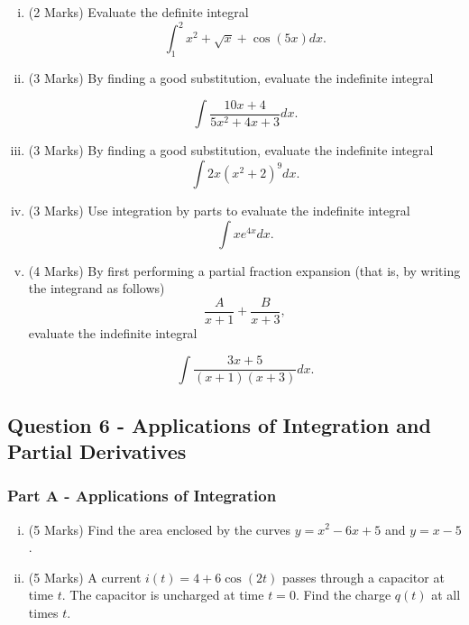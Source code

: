 \documentclass[a4paper,12pt]{article}
\begin{document}

\begin{enumerate}[(i)]
	\item (2 Marks)  Evaluate the definite integral
	\[ \int^2_1 x^2 + \sqrt{x} + \cos(5x) dx. \]
	\item (3 Marks) By finding a good substitution, evaluate the indefinite integral

  \[ \int \frac{10x + 4}{5x^2 + 4x + 3} dx.\]
	
	\item (3 Marks) By finding a good substitution, evaluate the indefinite integral
	\[ \int 2x(x^2 + 2)^9 dx.\]
	\item (3 Marks) Use integration by parts to evaluate the indefinite integral
	\[ \int  xe^{4x} dx. \]
	\item (4 Marks) By first performing a partial fraction expansion (that is, by writing the integrand
	as follows)
	\[  \frac{A}{x + 1} + \frac{B}{x + 3},
	\]evaluate the indefinite integral

	\[ \int \frac{3x + 5}{(x + 1)(x + 3)}  dx. \]

\end{enumerate}

\newpage
\subsection*{Question 6  - Applications of Integration and Partial Derivatives}

\subsubsection*{Part A - Applications of Integration}
\begin{enumerate}[(i)]
	\item (5 Marks) Find the area enclosed by the curves $y=x^2-6x+5$ and $y=x-5$.
\item (5 Marks) A current $i(t) = 4 + 6\cos(2t)$ passes through a capacitor at time $t$.
The capacitor is uncharged at time $ t = 0 $. Find the charge $q(t)$ at all times $t$.
%
\end{enumerate}
\end{document}
